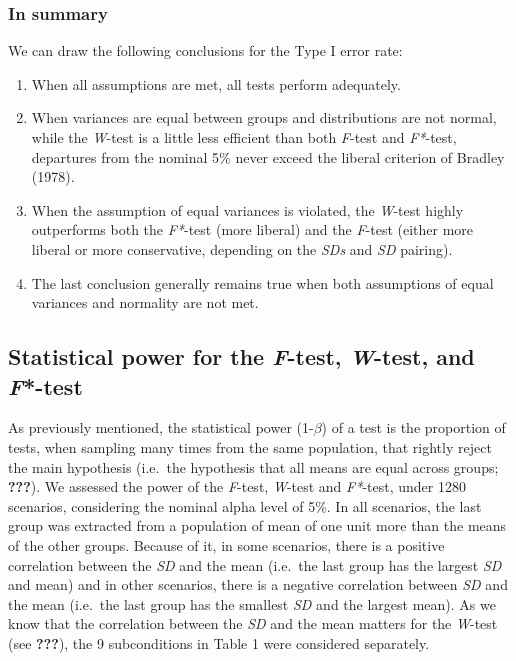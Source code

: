 \documentclass[man,floatsintext]{apa6}
\providecommand{\tightlist}{%
  \setlength{\itemsep}{0pt}\setlength{\parskip}{0pt}}
\begin{document}
\subsubsection{In summary}\label{in-summary}

We can draw the following conclusions for the Type I error rate:

\begin{enumerate}
\def\labelenumi{\arabic{enumi})}
\tightlist
\item
  When all assumptions are met, all tests perform adequately.\\
\item
  When variances are equal between groups and distributions are not
  normal, while the \emph{W}-test is a little less efficient than both
  \emph{F}-test and \emph{F*}-test, departures from the nominal 5\%
  never exceed the liberal criterion of Bradley (1978).\\
\item
  When the assumption of equal variances is violated, the \emph{W}-test
  highly outperforms both the \emph{F*}-test (more liberal) and the
  \emph{F}-test (either more liberal or more conservative, depending on
  the \emph{SDs} and \emph{SD} pairing).\\
\item
  The last conclusion generally remains true when both assumptions of
  equal variances and normality are not met.
\end{enumerate}

\subsection{\texorpdfstring{Statistical power for the \emph{F}-test,
\emph{W}-test, and
\emph{F}*-test}{Statistical power for the F-test, W-test, and F*-test}}\label{statistical-power-for-the-f-test-w-test-and-f-test}

As previously mentioned, the statistical power (1-\(\beta\)) of a test
is the proportion of tests, when sampling many times from the same
population, that rightly reject the main hypothesis (i.e.~the hypothesis
that all means are equal across groups; {\textbf{???}}). We assessed the
power of the \emph{F}-test, \emph{W}-test and \emph{F*}-test, under 1280
scenarios, considering the nominal alpha level of 5\%. In all scenarios,
the last group was extracted from a population of mean of one unit more
than the means of the other groups. Because of it, in some scenarios,
there is a positive correlation between the \emph{SD} and the mean
(i.e.~the last group has the largest \emph{SD} and mean) and in other
scenarios, there is a negative correlation between \emph{SD} and the
mean (i.e.~the last group has the smallest \emph{SD} and the largest
mean). As we know that the correlation between the \emph{SD} and the
mean matters for the \emph{W}-test (see {\textbf{???}}), the 9
subconditions in Table 1 were considered separately.
\end{document}
